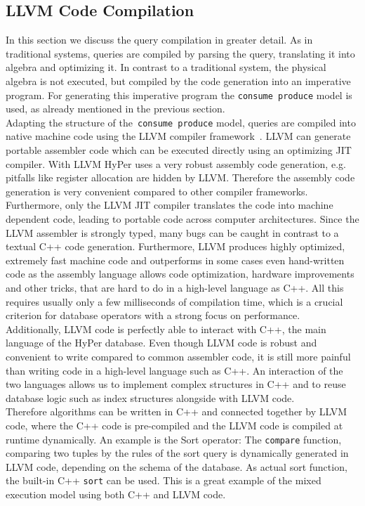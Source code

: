 \subsection{LLVM Code Compilation}

In this section we discuss the query compilation in greater detail. As in traditional systems, queries are compiled by parsing the query, translating it into algebra and optimizing it. In contrast to a traditional system, the physical algebra is not executed, but compiled by the code generation into an imperative program. For generating this imperative program the \texttt{consume produce} model is used, as already mentioned in the previous section.
\\
Adapting the structure of the~\texttt{consume produce} model, queries are compiled into native machine code using the LLVM compiler framework~\parencite{LLVM}. LLVM can generate portable assembler code which can be executed directly using an optimizing JIT compiler. With LLVM HyPer uses a very robust assembly code generation, e.g. pitfalls like register allocation are hidden by LLVM. Therefore the assembly code generation is very convenient compared to other compiler frameworks. Furthermore, only the LLVM JIT compiler translates the code into machine dependent code, leading to portable code across computer architectures. Since the LLVM assembler is strongly typed, many bugs can be caught in contrast to a textual C++ code generation. Furthermore, LLVM produces highly optimized, extremely fast machine code and outperforms in some cases even hand-written code as the assembly language allows code optimization, hardware improvements and other tricks, that are hard to do in a high-level language as C++. All this requires usually only a few milliseconds of compilation time, which is a crucial criterion for database operators with a strong focus on performance.
\\
Additionally, LLVM code is perfectly able to interact with C++, the main language of the HyPer database. Even though LLVM code is robust and convenient to write compared to common assembler code, it is still more painful than writing code in a high-level language such as C++. An interaction of the two languages allows us to implement complex structures in C++ and to reuse database logic such as index structures alongside with LLVM code. 
\\
Therefore algorithms can be written in C++ and connected together by LLVM code, where the C++ code is pre-compiled and the LLVM code is compiled at runtime dynamically. An example is the Sort operator: The \texttt{compare} function, comparing two tuples by the rules of the sort query is dynamically generated in LLVM code, depending on the schema of the database. As actual sort function, the built-in C++ \texttt{sort} can be used. This is a great example of the mixed execution model using both C++ and LLVM code.
